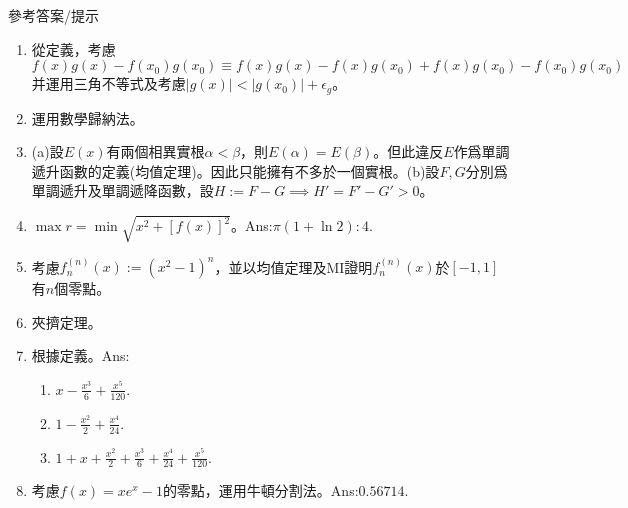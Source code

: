 \documentclass[12pt]{article}
\begin{document}
    \begin{center}
        參考答案/提示
    \end{center}
    \begin{enumerate}
        \item 從定義，考慮$f(x)g(x)-f(x_0)g(x_0)\equiv f(x)g(x)-f(x)g(x_0)+f(x)g(x_0)-f(x_0)g(x_0)$并運用三角不等式及考慮$|g(x)|<|g(x_0)|+\epsilon_g$。
        \item 運用數學歸納法。
        \item (a)設$E(x)$有兩個相異實根$\alpha<\beta$，則$E(\alpha)=E(\beta)$。但此違反$E$作爲單調遞升函數的定義(均值定理)。因此只能擁有不多於一個實根。(b)設$F,G$分別爲單調遞升及單調遞降函數，設$H:=F-G\implies H'=F'-G'>0$。
        \item $\max r = \min \sqrt{x^2+[f(x)]^2}$。Ans:$\pi(1+\ln{2}):4$.
        \item 考慮$f_n^{(n)}(x):=(x^2-1)^n$，並以均值定理及MI證明$f_n^{(n)}(x)$於$[-1,1]$有$n$個零點。
        \item 夾擠定理。
        \item 根據定義。Ans:\begin{enumerate}
            \item $x-\frac{x^3}{6}+\frac{x^5}{120}$.
            \item $1-\frac{x^2}{2}+\frac{x^4}{24}$.
            \item $1+x+\frac{x^2}{2}+\frac{x^3}{6}+\frac{x^4}{24}+\frac{x^5}{120}$.
        \end{enumerate}
        \item 考慮$f(x)=xe^x-1$的零點，運用牛頓分割法。Ans:$0.56714$.
    \end{enumerate}
\end{document}
